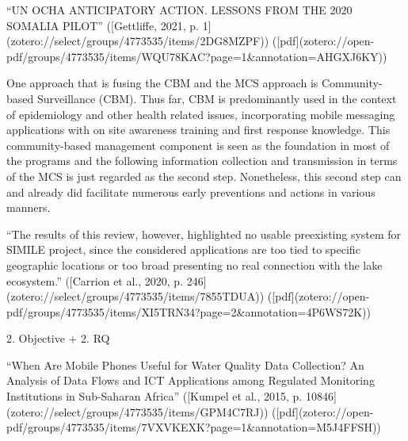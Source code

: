 “UN OCHA ANTICIPATORY ACTION. LESSONS FROM THE 2020 SOMALIA PILOT” ([Gettliffe, 2021, p. 1](zotero://select/groups/4773535/items/2DG8MZPF)) ([pdf](zotero://open-pdf/groups/4773535/items/WQU78KAC?page=1&annotation=AHGXJ6KY))

One approach that is fusing the CBM and the MCS approach is Community-based Surveillance (CBM). Thus far, CBM is predominantly used in the context of epidemiology and other health related issues, incorporating mobile messaging applications with on site awareness training and first response knowledge. This community-based management component is seen as the foundation in most of the programs and the following information collection and transmission in terms of the MCS is just regarded as the second step. Nonetheless, this second step can and already did facilitate numerous early preventions and actions in various manners.








“The results of this review, however, highlighted no usable preexisting system for SIMILE project, since the considered applications are too tied to specific geographic locations or too broad presenting no real connection with the lake ecosystem.” ([Carrion et al., 2020, p. 246](zotero://select/groups/4773535/items/7855TDUA)) ([pdf](zotero://open-pdf/groups/4773535/items/XI5TRN34?page=2&annotation=4P6WS72K))



2. Objective + 2. RQ

“When Are Mobile Phones Useful for Water Quality Data Collection? An Analysis of Data Flows and ICT Applications among Regulated Monitoring Institutions in Sub-Saharan Africa” ([Kumpel et al., 2015, p. 10846](zotero://select/groups/4773535/items/GPM4C7RJ)) ([pdf](zotero://open-pdf/groups/4773535/items/7VXVKEXK?page=1&annotation=M5J4FFSH))

